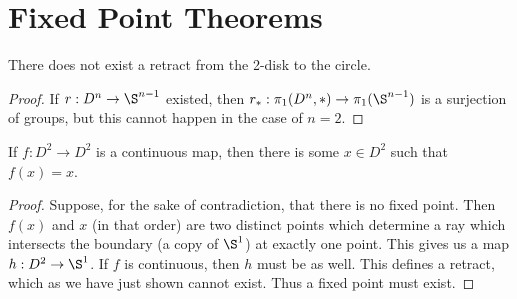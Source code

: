 
\section*{Fixed Point Theorems}

\begin{theorem}
	There does not exist a retract from the 2-disk to the circle.
\end{theorem}

\begin{proof}
	
If $r:D^n\rightarrow \S^{n-1}$ existed, then $r_\ast:\pi_1(D^n,\ast)\rightarrow \pi_1(\S^{n-1})$ is a surjection of groups, but this cannot happen in the case of $n=2$.
	
\end{proof}


\begin{theorem}
	If $f:D^2\rightarrow D^2$ is a continuous map, then there is some $x\in D^2$ such that $f(x)=x$.
\end{theorem}

\begin{proof}
	Suppose, for the sake of contradiction, that there is no fixed point.  Then $f(x)$ and $x$ (in that order) are two distinct points which determine a ray which intersects the boundary (a copy of $\S^1$) at exactly one point.  This gives us a map $h:D^2\rightarrow \S^1$.  If $f$ is continuous, then $h$ must be as well.  This defines a retract, which as we have just shown cannot exist.  Thus a fixed point must exist.
\end{proof}


